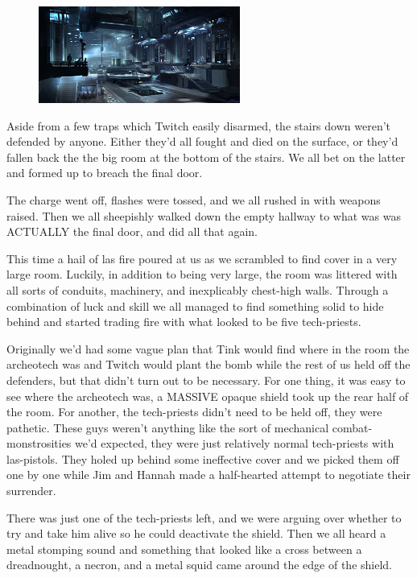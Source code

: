 \begin{figure}
	\begin{center}
		\includegraphics[width=\figwidth]{pics/11/77.png}
	\end{center}
\end{figure}
Aside from a few traps which Twitch easily disarmed, the stairs down weren't defended by anyone. 
Either they'd all fought and died on the surface, or they'd fallen back the the big room at the bottom of the stairs. 
We all bet on the latter and formed up to breach the final door.

The charge went off, flashes were tossed, and we all rushed in with weapons raised. 
Then we all sheepishly walked down the empty hallway to what was was ACTUALLY the final door, and did all that again.

This time a hail of las fire poured at us as we scrambled to find cover in a very large room. 
Luckily, in addition to being very large, the room was littered with all sorts of conduits, machinery, and inexplicably chest-high walls. 
Through a combination of luck and skill we all managed to find something solid to hide behind and started trading fire with what looked to be five tech-priests.

Originally we'd had some vague plan that Tink would find where in the room the archeotech was and Twitch would plant the bomb while the rest of us held off the defenders, but that didn't turn out to be necessary. 
For one thing, it was easy to see where the archeotech was, a MASSIVE opaque shield took up the rear half of the room. 
For another, the tech-priests didn't need to be held off, they were pathetic. 
These guys weren't anything like the sort of mechanical combat-monstrosities we'd expected, they were just relatively normal tech-priests with las-pistols. 
They holed up behind some ineffective cover and we picked them off one by one while Jim and Hannah made a half-hearted attempt to negotiate their surrender.

There was just one of the tech-priests left, and we were arguing over whether to try and take him alive so he could deactivate the shield. 
Then we all heard a metal stomping sound and something that looked like a cross between a dreadnought, a necron, and a metal squid came around the edge of the shield.

